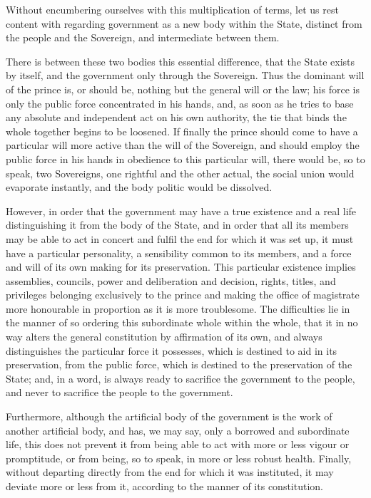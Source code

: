 \documentclass[12pt]{book}
\begin{document}
Without encumbering ourselves with this multiplication of terms, let us rest content with regarding government as a new body within the State, distinct from the people and the Sovereign, and intermediate between them.

There is between these two bodies this essential difference, that the State exists by itself, and the government only through the Sovereign. Thus the dominant will of the prince is, or should be, nothing but the general will or the law; his force is only the public force concentrated in his hands, and, as soon as he tries to base any absolute and independent act on his own authority, the tie that binds the whole together begins to be loosened. If finally the prince should come to have a particular will more active than the will of the Sovereign, and should employ the public force in his hands in obedience to this particular will, there would be, so to speak, two Sovereigns, one rightful and the other actual, the social union would evaporate instantly, and the body politic would be dissolved.

However, in order that the government may have a true existence and a real life distinguishing it from the body of the State, and in order that all its members may be able to act in concert and fulfil the end for which it was set up, it must have a particular personality, a sensibility common to its members, and a force and will of its own making for its preservation. This particular existence implies assemblies, councils, power and deliberation and decision, rights, titles, and privileges belonging exclusively to the prince and making the office of magistrate more honourable in proportion as it is more troublesome. The difficulties lie in the manner of so ordering this subordinate whole within the whole, that it in no way alters the general constitution by affirmation of its own, and always distinguishes the particular force it possesses, which is destined to aid in its preservation, from the public force, which is destined to the preservation of the State; and, in a word, is always ready to sacrifice the government to the people, and never to sacrifice the people to the government.

Furthermore, although the artificial body of the government is the work of another artificial body, and has, we may say, only a borrowed and subordinate life, this does not prevent it from being able to act with more or less vigour or promptitude, or from being, so to speak, in more or less robust health. Finally, without departing directly from the end for which it was instituted, it may deviate more or less from it, according to the manner of its constitution.
\end{document}
